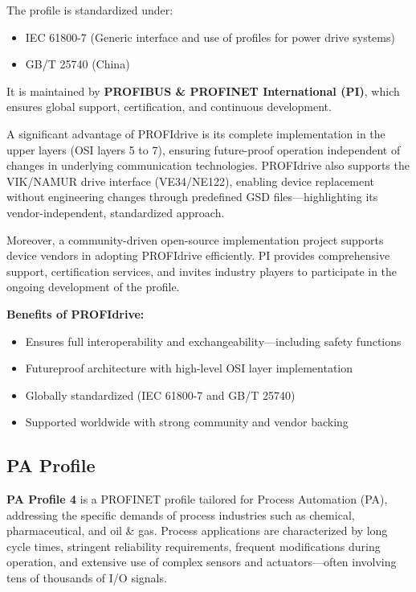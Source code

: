 \documentclass[conference]{IEEEtran}
\begin{document}
The profile is standardized under:
\begin{itemize}
    \item IEC 61800-7 (Generic interface and use of profiles for power drive systems)
    \item GB/T 25740 (China)
\end{itemize}
It is maintained by \textbf{PROFIBUS \& PROFINET International (PI)}, which ensures global support, certification, and continuous development.

A significant advantage of PROFIdrive is its complete implementation in the upper layers (OSI layers 5 to 7), ensuring future-proof operation independent of changes in underlying communication technologies. PROFIdrive also supports the VIK/NAMUR drive interface (VE34/NE122), enabling device replacement without engineering changes through predefined GSD files—highlighting its vendor-independent, standardized approach.

Moreover, a community-driven open-source implementation project supports device vendors in adopting PROFIdrive efficiently. PI provides comprehensive support, certification services, and invites industry players to participate in the ongoing development of the profile.

\textbf{Benefits of PROFIdrive:}
\begin{itemize}
    \item Ensures full interoperability and exchangeability—including safety functions
    \item Futureproof architecture with high-level OSI layer implementation
    \item Globally standardized (IEC 61800-7 and GB/T 25740)
    \item Supported worldwide with strong community and vendor backing
\end{itemize}

\subsection{PA Profile }
\label{subsec: pAProfile}
\textbf{PA Profile 4} is a PROFINET profile tailored for Process Automation (PA), addressing the specific demands of process industries such as chemical, pharmaceutical, and oil \& gas. Process applications are characterized by long cycle times, stringent reliability requirements, frequent modifications during operation, and extensive use of complex sensors and actuators—often involving tens of thousands of I/O signals.
\end{document}
